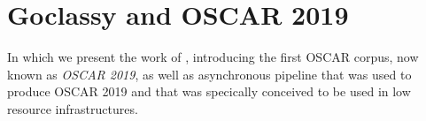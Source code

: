 \chapter{Goclassy and OSCAR 2019}

\begin{center}
    \begin{minipage}{0.5\textwidth}
        \begin{small}
            In which we present the work of \citet{ortiz-suarez-etal-2019-asynchronous}, introducing the first OSCAR corpus, now known as \emph{OSCAR 2019}, as well as asynchronous pipeline \goclassy that was used to produce OSCAR 2019 and that was specically conceived to be used in low resource infrastructures.
        \end{small}
    \end{minipage}
    \vspace{0.5cm}
\end{center}


